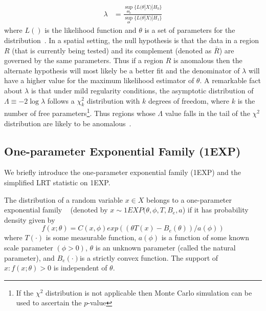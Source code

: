 \documentclass[10pt,journal,cspaper,compsoc]{IEEEtran}
\begin{document}
\begin{equation}
\begin{split}
\lambda&=\frac{\sup_{\Theta_0}\{L(\theta|X)|H_{0}\}}
{\sup_{\Theta}\{L(\theta|X)|H_{1}\}}
\label{eq}
\end{split}
\end{equation}
\noindent where $L()$ is the likelihood function and  $\theta$ is a set of parameters
for the distribution~\cite{jour}. In a spatial setting, the null hypothesis is that the data in a region $R$ (that is currently being tested) and
its complement (denoted as $\bar R$) are governed by the same
parameters. Thus if a region $R$ is anomalous then the alternate hypothesis will most likely be a better fit and the denominator of $\lambda$ will have a higher value for the maximum likelihood
estimator of $\theta$.  A remarkable fact about $\lambda$ is that under mild
regularity conditions, the asymptotic distribution of $\Lambda \equiv -2\log\lambda$ follows a $\chi^{2}_{k}$ distribution with $k$ degrees of freedom, where
$k$ is the number of free parameters\footnote{If the $\chi^{2}$ distribution is not applicable then Monte Carlo simulation can be used to ascertain the $p$-value}. Thus regions whose $\Lambda$ value falls in the tail of the $\chi^{2}$ distribution are likely to be anomalous~\cite{jour}.


\subsection{One-parameter Exponential Family (1EXP)}
We briefly introduce the one-parameter exponential family (1EXP) and the simplified LRT statistic on 1EXP.

 The distribution of a random variable $x\in X$ belongs to a one-parameter exponential family ~\cite{DagMaxmize} (denoted by $x\sim 1EXP(\theta,\phi,T,B_e,a$) if it has probability density given by
\begin{equation}
f(x; \theta )=C(x,\phi)exp((\theta T(x)-B_e(\theta))/a(\phi))
\label{oneexp}
\end{equation}
where  $T(\cdot)$ is some measurable function, $a(\phi)$ is a function of some known scale parameter $(\phi>0)$, $\theta$ is an unknown parameter (called the natural parameter), and $B_e(\cdot)$is a strictly convex function. The support of ${x:f(x;\theta)>0}$ is independent of $\theta$.
\end{document}

